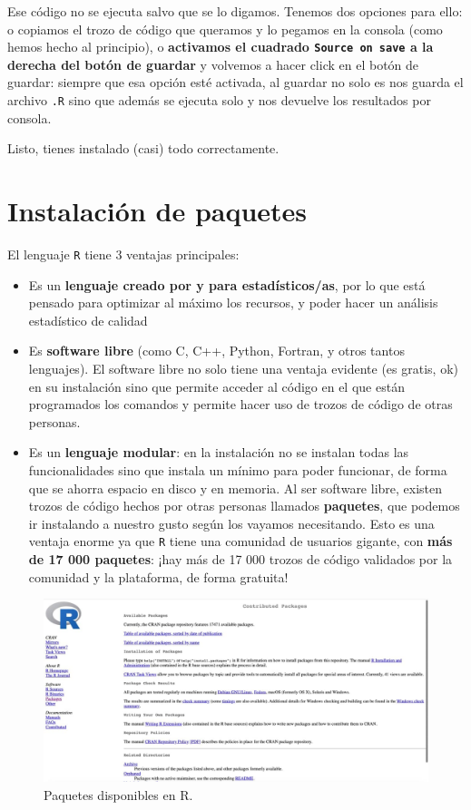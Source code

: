 \documentclass[11pt,]{book}
\begin{document}
Ese código no se ejecuta salvo que se lo digamos. Tenemos dos opciones para ello: o copiamos el trozo de código que queramos y lo pegamos en la consola (como hemos hecho al principio), o \textbf{activamos el cuadrado \texttt{Source\ on\ save} a la derecha del botón de guardar} y volvemos a hacer click en el botón de guardar: siempre que esa opción esté activada, al guardar no solo es nos guarda el archivo \texttt{.R} sino que además se ejecuta solo y nos devuelve los resultados por consola.

Listo, tienes instalado (casi) todo correctamente.

\hypertarget{instalacionpaquetes}{%
\section{Instalación de paquetes}\label{instalacionpaquetes}}

El lenguaje \texttt{R} tiene 3 ventajas principales:

\begin{itemize}
\item
  Es un \textbf{lenguaje creado por y para estadísticos/as}, por lo que está pensado para optimizar al máximo los recursos, y poder hacer un análisis estadístico de calidad
\item
  Es \textbf{software libre} (como C, C++, Python, Fortran, y otros tantos lenguajes). El software libre no solo tiene una ventaja evidente (es gratis, ok) en su instalación sino que permite acceder al código en el que están programados los comandos y permite hacer uso de trozos de código de otras personas.
\item
  Es un \textbf{lenguaje modular}: en la instalación no se instalan todas las funcionalidades sino que instala un mínimo para poder funcionar, de forma que se ahorra espacio en disco y en memoria. Al ser software libre, existen trozos de código hechos por otras personas llamados \textbf{paquetes}, que podemos ir instalando a nuestro gusto según los vayamos necesitando. Esto es una ventaja enorme ya que \texttt{R} tiene una comunidad de usuarios gigante, con \textbf{más de 17 000 paquetes}: ¡hay más de 17 000 trozos de código validados por la comunidad y la plataforma, de forma gratuita!
\end{itemize}

\begin{figure}

{\centering \includegraphics[width=0.75\linewidth]{./img/paquetes_R} 

}

\caption{Paquetes disponibles en R.}\label{fig:paquetes-R}
\end{figure}
\end{document}
